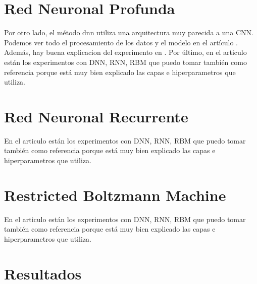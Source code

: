 \section{Red Neuronal Profunda}
Por otro lado, el método \gls{dnn} utiliza una arquitectura muy parecida a una CNN. Podemos ver todo el procesamiento de los datos y el modelo en el artículo \citep{maithem2021network}. Además, hay buena explicacion del experimento en \citep{vigneswaran2018evaluating}. Por último, en el articulo \citep{elmasry2019empirical} están los experimentos con DNN, RNN,  RBM que puedo tomar también como referencia porque está muy bien explicado las capas e hiperparametros que utiliza.

\section{Red Neuronal Recurrente}
En el articulo \citep{elmasry2019empirical} están los experimentos con DNN, RNN,  RBM que puedo tomar también como referencia porque está muy bien explicado las capas e hiperparametros que utiliza.

\section{Restricted Boltzmann Machine}
En el articulo \citep{elmasry2019empirical} están los experimentos con DNN, RNN,  RBM que puedo tomar también como referencia porque está muy bien explicado las capas e hiperparametros que utiliza.


\section{Resultados}




